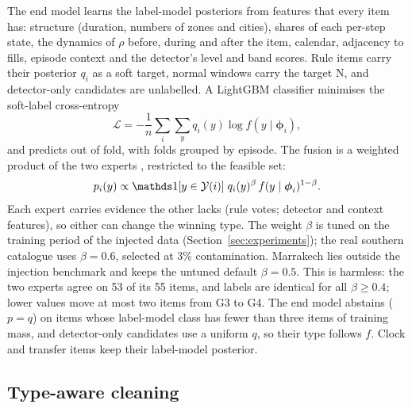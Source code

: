The end model learns the label-model posteriors from features that every item has: structure (duration, numbers of zones and cities), shares of each per-step state, the dynamics of $\rho$ before, during and after the item, calendar, adjacency to fills, episode context and the detector's level and band scores. Rule items carry their posterior $q_i$ as a soft target, normal windows carry the target N, and detector-only candidates are unlabelled. A LightGBM classifier \cite{ke2017lightgbm} minimises the soft-label cross-entropy
\begin{equation}
\mathcal{L} = -\frac{1}{n} \sum_{i} \sum_{y} q_i(y) \log f(y \mid \boldsymbol{\phi}_i),
\label{eq:endmodel}
\end{equation}
and predicts out of fold, with folds grouped by episode. The fusion is a weighted product of the two experts \cite{hinton2002poe}, restricted to the feasible set:
\begin{equation}
p_i(y) \propto \one[y \in \mathcal{Y}(i)]\; q_i(y)^{\beta}\, f(y \mid \boldsymbol{\phi}_i)^{1-\beta}.
\label{eq:fusion}
\end{equation}
Each expert carries evidence the other lacks (rule votes; detector and context features), so either can change the winning type. The weight $\beta$ is tuned on the training period of the injected data (Section~\ref{sec:experiments}); the real southern catalogue uses $\beta = 0.6$, selected at 3\% contamination. Marrakech lies outside the injection benchmark and keeps the untuned default $\beta = 0.5$. This is harmless: the two experts agree on 53 of its 55 items, and labels are identical for all $\beta \geq 0.4$; lower values move at most two items from G3 to G4. The end model abstains ($p = q$) on items whose label-model class has fewer than three items of training mass, and detector-only candidates use a uniform $q$, so their type follows $f$. Clock and transfer items keep their label-model posterior. %

\subsection{Type-aware cleaning}\label{sec:cleaning}

